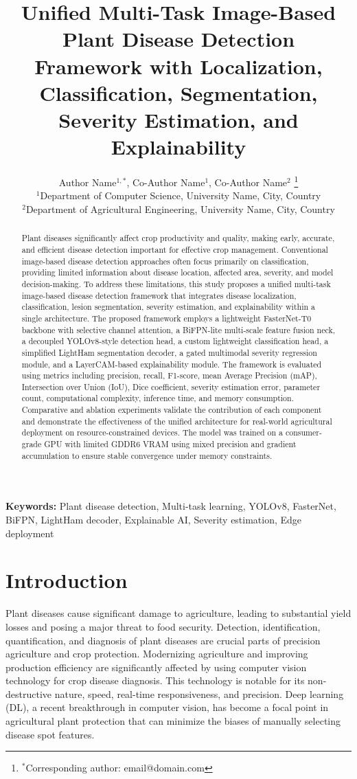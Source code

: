 \documentclass[10pt,a4paper,twocolumn]{article}
\title{Unified Multi-Task Image-Based Plant Disease Detection Framework with Localization, Classification, Segmentation, Severity Estimation, and Explainability}
\author{
    Author Name$^{1,*}$,
    Co-Author Name$^{1}$,
    Co-Author Name$^{2}$
    \thanks{$^{*}$Corresponding author: email@domain.com}
    \\
    $^{1}$Department of Computer Science, University Name, City, Country \\
    $^{2}$Department of Agricultural Engineering, University Name, City, Country
}
\date{}
\begin{document}
\maketitle

\begin{abstract}
Plant diseases significantly affect crop productivity and quality, making early, accurate, and efficient disease detection important for effective crop management. Conventional image-based disease detection approaches often focus primarily on classification, providing limited information about disease location, affected area, severity, and model decision-making. To address these limitations, this study proposes a unified multi-task image-based disease detection framework that integrates disease localization, classification, lesion segmentation, severity estimation, and explainability within a single architecture. The proposed framework employs a lightweight FasterNet-T0 backbone with selective channel attention, a BiFPN-lite multi-scale feature fusion neck, a decoupled YOLOv8-style detection head, a custom lightweight classification head, a simplified LightHam segmentation decoder, a gated multimodal severity regression module, and a LayerCAM-based explainability module. The framework is evaluated using metrics including precision, recall, F1-score, mean Average Precision (mAP), Intersection over Union (IoU), Dice coefficient, severity estimation error, parameter count, computational complexity, inference time, and memory consumption. Comparative and ablation experiments validate the contribution of each component and demonstrate the effectiveness of the unified architecture for real-world agricultural deployment on resource-constrained devices. The model was trained on a consumer-grade GPU with limited GDDR6 VRAM using mixed precision and gradient accumulation to ensure stable convergence under memory constraints.
\end{abstract}

\textbf{Keywords:} Plant disease detection, Multi-task learning, YOLOv8, FasterNet, BiFPN, LightHam decoder, Explainable AI, Severity estimation, Edge deployment

\section{Introduction}
\label{sec:intro}

Plant diseases cause significant damage to agriculture, leading to substantial yield losses and posing a major threat to food security. Detection, identification, quantification, and diagnosis of plant diseases are crucial parts of precision agriculture and crop protection. Modernizing agriculture and improving production efficiency are significantly affected by using computer vision technology for crop disease diagnosis. This technology is notable for its non-destructive nature, speed, real-time responsiveness, and precision. Deep learning (DL), a recent breakthrough in computer vision, has become a focal point in agricultural plant protection that can minimize the biases of manually selecting disease spot features.
\end{document}
